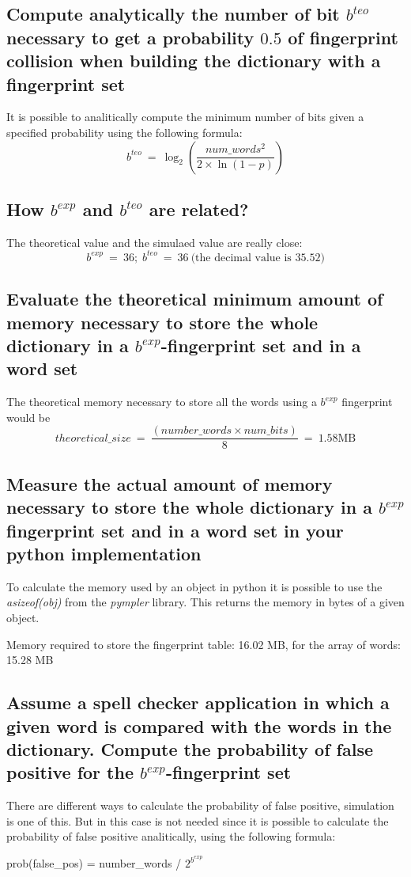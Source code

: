\documentclass{report}
\begin{document}
			\subsection{Compute analytically the number of bit $b^{teo}$ necessary to get a probability $0.5$ of fingerprint collision when building the dictionary with a fingerprint set}
					It is possible to analitically compute the minimum number of bits given a specified probability using the following formula:
					\[
						b^{teo} \: = \: \log_2{ \left( \frac{num\_words^2}{2\times \ln\left({1-p}\right)} \right)}
					\]
			\subsection{How $b^{exp}$ and $b^{teo}$ are related?}
					The theoretical value and the simulaed value are really close: 
					\[
							b^{exp} \: = \: 36; \; 	b^{teo} \: = \: 36 \: \text{(the decimal value is 35.52)}
					\]
			
			\subsection{Evaluate the theoretical minimum amount of memory necessary to store the whole dictionary in a $b^{exp}$-fingerprint set and in a word set}
			The theoretical memory necessary to store all the words using a $b^{exp}$ fingerprint would be \[ theoretical\_size \: = \: \frac{(number\_words \times num\_bits)}{8} \: = \: 1.58 \text{MB}\]
						
			\subsection{Measure the actual amount of memory necessary to store the whole dictionary in a $b^{exp}$ fingerprint set and in a word set in your python implementation}
			To calculate the memory used by an object in python it is possible to use the \emph{asizeof(obj)} from the \emph{pympler} library. This returns the memory in bytes of a given object.
			\begin{center}
					Memory required to store the fingerprint table: 16.02 MB, for the array of words: 15.28 MB
			\end{center}
			
			\subsection{Assume a spell checker application in which a given word is compared with the words in the dictionary. Compute the probability of false positive for the $b^{exp}$-fingerprint set}
			There are different ways to calculate the probability of false positive, simulation is one of this. But in this case is not needed since it is possible to calculate the probability of false positive analitically, using the following formula:
			\begin{center}
					prob(false\_pos) = number\_words / $2^{b^{exp}}$
			\end{center}
			
\end{document}
